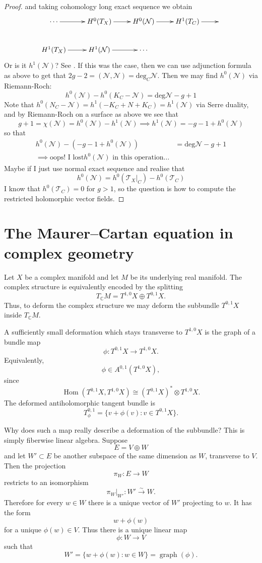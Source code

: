 \begin{proof}
and taking cohomology long exact sequence we
obtain
$$
\xymatrix{
\cdots\ar[r]&H^{0}(T_X)\ar[r]&H^{0}
(\mathcal{N})\ar[r]&H^{1}(T_C)\ar[r]&\\
H^{1}(T_X)\ar[r]&H^{1}(\mathcal{N})\ar[r]&
\cdots
}
$$
\medskip\noindent
Or is it $h^1(\mathcal{N})$? See
\cite{HarrMorr}. If this was the case, then
we
can use adjunction formula as above to get
that
$2g-2=(\mathcal{N},\mathcal{N})=\text{deg}_C
\mathcal{N}$. Then we may find
$h^0(\mathcal{N})$ via Riemann-Roch:
$$
h^0(\mathcal{N})-h^0(K_C-\mathcal{N})=
\text{deg}\mathcal{N}-g+1
$$
Note that
$h^0(N_C-\mathcal{N})=h^1(-K_C+N+K_C)=
h^1(\mathcal{N})$
via Serre
duality, and by Riemann-Roch on a surface as
above we see that
$$
g+1=\chi(\mathcal{N})=h^0(\mathcal{N})-
h^1(\mathcal{N})
\implies
h^1(\mathcal{N})=-g-1+h^0(\mathcal{N})
$$
so that
$$
\begin{aligned}
h^0(\mathcal{N})-(-g-1+h^0(\mathcal{N}))&=
\text{deg}\mathcal{N}-g+1\\
\implies \text{oops! I lost
$h^0(\mathcal{N})$ in this operation…}
\end{aligned}
$$
Maybe if I just use normal exact sequence and
realise that
$$
h^0(\mathcal{N})=h^0(\mathcal{T}_X|_{C})-
h^0(\mathcal{T}_C)
$$
I know that $h^0(\mathcal{T}_C)=0$ for $g>1$,
so the question is how to compute
the restricted holomorphic vector fields.
\end{proof}

\section{The Maurer--Cartan equation in complex geometry}
\label{section-maurer-cartan-complex-geometry}

\noindent
Let $X$ be a complex manifold and let $M$ be its
underlying real manifold. The complex structure is
equivalently encoded by the splitting
$$
T_{\mathbb C}M=T^{1,0}X\oplus T^{0,1}X.
$$
Thus, to deform the complex structure we may deform
the subbundle $T^{0,1}X$ inside $T_{\mathbb C}M$.

A sufficiently small deformation which stays transverse
to $T^{1,0}X$ is the graph of a bundle map
$$
\phi:T^{0,1}X\longrightarrow T^{1,0}X.
$$
Equivalently,
$$
\phi\in A^{0,1}(T^{1,0}X),
$$
since
$$
\operatorname{Hom}(T^{0,1}X,T^{1,0}X)
\cong (T^{0,1}X)^*\otimes T^{1,0}X.
$$
The deformed antiholomorphic tangent bundle is
$$
T^{0,1}_\phi
=\{v+\phi(v):v\in T^{0,1}X\}.
$$

Why does such a map really describe a deformation of the
subbundle? This is simply fiberwise linear algebra. Suppose
$$
E=V\oplus W
$$
and let $W'\subset E$ be another subspace of the same
dimension as $W$, transverse to $V$. Then the projection
$$
\pi_W:E\longrightarrow W
$$
restricts to an isomorphism
$$
\pi_W|_{W'}:W'\xrightarrow{\sim}W.
$$
Therefore for every $w\in W$ there is a unique vector of
$W'$ projecting to $w$. It has the form
$$
w+\phi(w)
$$
for a unique $\phi(w)\in V$. Thus there is a unique linear
map
$$
\phi:W\longrightarrow V
$$
such that
$$
W'=\{w+\phi(w):w\in W\}=\operatorname{graph}(\phi).
$$

